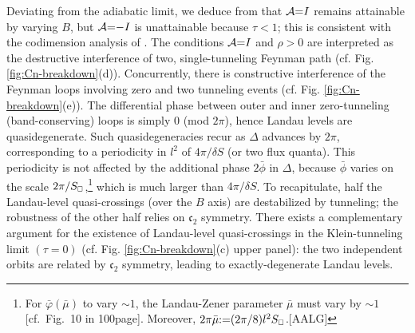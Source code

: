 \documentclass[aps, prb, showpacs, twocolumn, notitlepage, superscriptaddress]{revtex4-1}
\begin{document}
Deviating from the adiabatic limit, we deduce from  that  ${\cal A}{=}I$ remains attainable by varying $B$, but ${\cal A}{=}{-}I$ is unattainable because $\tau{<}1$; this is consistent with the codimension analysis of . The conditions ${\cal A}{=}I$ and $\rho{>}0$ are interpreted as the destructive interference of  two, single-tunneling Feynman path (cf. Fig. \ref{fig:Cn-breakdown}(d)). Concurrently, there is constructive interference of the Feynman loops involving zero and two tunneling events (cf. Fig. \ref{fig:Cn-breakdown}(e)). The differential phase between outer and inner zero-tunneling (band-conserving) loops is simply 0 (mod $2\pi$), hence Landau levels are quasidegenerate. Such quasidegeneracies recur as $\Delta$ advances by $2\pi$, corresponding to a periodicity in $l^2$ of $4\pi/\delta S$ (or two flux quanta). This periodicity is not affected by the additional phase $2\bar{\phi}$ in $\Delta$, because $\bar{\phi}$ varies on the scale  $2\pi/S_{\scriptscriptstyle{\square}}$,\footnote{For $\bar{\varphi}(\bar{\mu})$ to vary  $\sim 1$, the Landau-Zener parameter $\bar{\mu}$ must vary by $\sim 1$ [cf.\  Fig.\ 10 in 100page]. Moreover, $2\pi\bar{\mu}{:}{=} (2\pi/8) l^2S_{\scriptscriptstyle{\square}}$.[AALG]} which is much larger than $4\pi/\delta S$. To recapitulate, half the Landau-level quasi-crossings (over the $B$ axis) are destabilized  by tunneling; the robustness of the other half relies on $\mathfrak{c}_2$ symmetry. There exists a complementary argument for the existence of Landau-level quasi-crossings in the Klein-tunneling limit $(\tau{=}0)$ (cf. Fig. \ref{fig:Cn-breakdown}(c) upper panel): the two independent orbits are related by $\mathfrak{c}_2$ symmetry, leading to exactly-degenerate Landau levels.  







\end{document}
